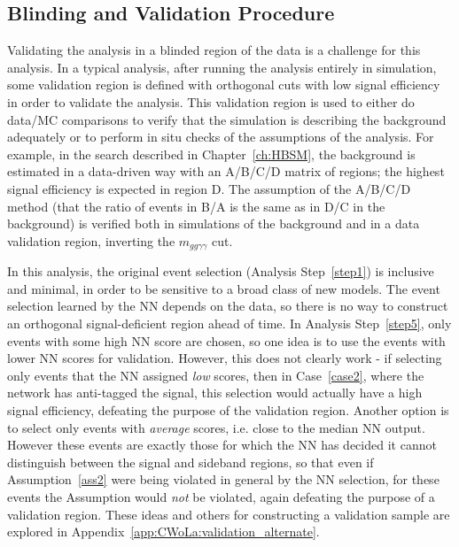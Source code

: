 \clearpage
\subsection{Blinding and Validation Procedure}
\label{sec:CWoLa:blinding}
Validating the analysis in a blinded region of the data is a challenge for this analysis.
In a typical analysis, after running the analysis entirely in simulation, some validation region is defined with orthogonal cuts with low signal efficiency in order to validate the analysis.
This validation region is used to either do data/MC comparisons to verify that the simulation is describing the background adequately or to perform in situ checks of the assumptions of the analysis.
For example, in the search described in Chapter~\ref{ch:HBSM}, the background is estimated in a data-driven way with an A/B/C/D matrix of regions; the highest signal efficiency is expected in region D.
The assumption of the A/B/C/D method (that the ratio of events in B/A is the same as in D/C in the background) is verified both in simulations of the background and in a data validation region, inverting the $m_{gg\gamma\gamma}$ cut.

In this analysis, the original event selection (Analysis Step~\ref{step1}) is inclusive and minimal, in order to be sensitive to a broad class of new models.
The event selection learned by the NN depends on the data, so there is no way to construct an orthogonal signal-deficient region ahead of time.
In Analysis Step~\ref{step5}, only events with some high NN score are chosen, so one idea is to use the events with lower NN scores for validation.
However, this does not clearly work - if selecting only events that the NN assigned \textit{low} scores, then in Case~\ref{case2}, where the network has anti-tagged the signal, this selection would actually have a high signal efficiency, defeating the purpose of the validation region.
Another option is to select only events with \textit{average} scores, i.e. close to the median NN output.
However these events are exactly those for which the NN has decided it cannot distinguish between the signal and sideband regions, so that even if Assumption~\ref{ass2} were being violated in general by the NN selection, for these events the Assumption would \textit{not} be violated, again defeating the purpose of a validation region.
These ideas and others for constructing a validation sample are explored in Appendix~\ref{app:CWoLa:validation_alternate}.


